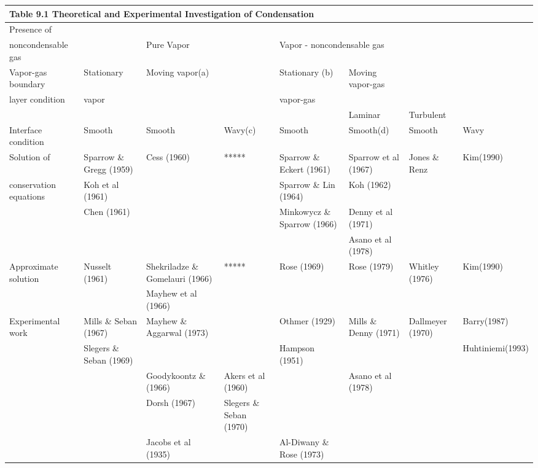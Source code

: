 \documentclass[12pt,fleqn]{report}
\begin{document}
{\newpage
\clearpage
\samepage \begin{sidewaystable}%
[hp]
\begin{minipage}{9.0in}
\begin{center}

{\tiny

\begin{tabular}{*{8}{l}}
\multicolumn{8}{l}{\bf Table 9.1  Theoretical and Experimental Investigation of Condensation} \\ [4mm] \hline
Presence of & & & & & & & \\ 
noncondensable gas & & Pure Vapor & & \multicolumn{2}{l}{Vapor - noncondensable gas} & & \\  [2mm] \hline
Vapor-gas boundary & Stationary & Moving vapor(a) & & Stationary (b) & Moving vapor-gas & & \\ 
layer condition & vapor & & & vapor-gas & &  & \\ 
& & & & & Laminar & Turbulent & \\  [2mm] \hline
Interface condition & Smooth & Smooth & Wavy(c) & Smooth & Smooth(d) & Smooth & Wavy\\  [2mm] \hline
Solution of & Sparrow \& Gregg (1959) & Cess (1960) & ***** & Sparrow \& Eckert (1961) & Sparrow et al (1967) & Jones \& Renz & Kim(1990)\\ 
conservation equations & Koh et al (1961) & & & Sparrow \& Lin (1964) & Koh (1962) & & \\ 
& Chen (1961) & & & Minkowycz \& Sparrow (1966) & Denny et al (1971) & & \\ 
& & & & & Asano et al (1978) & & \\  [2mm] \hline
Approximate solution & Nusselt (1961) &	Shekriladze \& Gomelauri     (1966) & *****	 & Rose (1969) & Rose (1979) & Whitley (1976) & Kim(1990)\\ 
& & Mayhew et al (1966) & & & & & \\  [2mm] \hline
Experimental work & Mills \& Seban (1967) & Mayhew \& Aggarwal (1973) & & Othmer (1929) & Mills \& Denny (1971) & Dallmeyer (1970) & Barry(1987)\\ 
& Slegers \& Seban (1969) & & & Hampson (1951) & & & Huhtiniemi(1993)\\ 
& & Goodykoontz \& (1966) & Akers et al (1960) & & Asano et al (1978) &	& \\ 
& & Dorsh (1967) & Slegers \& Seban (1970) & & & & \\ 
& & Jacobs et al (1935) & & Al-Diwany \& Rose (1973) & & & \\ 

\end{tabular}}
\end{center}
\end{minipage}
\end{sidewaystable}}
\end{document}
